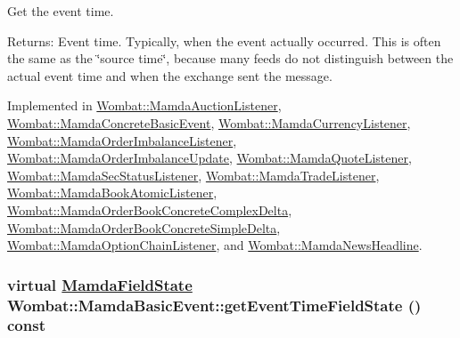Get the event time. 

\begin{Desc}
\item[Returns:]Event time. Typically, when the event actually occurred. This is often the same as the \char`\"{}source time\char`\"{}, because many feeds do not distinguish between the actual event time and when the exchange sent the message. \end{Desc}


Implemented in \hyperlink{classWombat_1_1MamdaAuctionListener_677e3629c44bbf21a134c1fb490658f8}{Wombat::Mamda\-Auction\-Listener}, \hyperlink{classWombat_1_1MamdaConcreteBasicEvent_887c69f7d9259d62ae323ddc3706ac44}{Wombat::Mamda\-Concrete\-Basic\-Event}, \hyperlink{classWombat_1_1MamdaCurrencyListener_f50eaef7c50bd1b1e58f0d38967d2b1c}{Wombat::Mamda\-Currency\-Listener}, \hyperlink{classWombat_1_1MamdaOrderImbalanceListener_6cac146703cca68aecfd579f512d8b99}{Wombat::Mamda\-Order\-Imbalance\-Listener}, \hyperlink{classWombat_1_1MamdaOrderImbalanceUpdate_b2468935aefaa514c68cd2722addc9ba}{Wombat::Mamda\-Order\-Imbalance\-Update}, \hyperlink{classWombat_1_1MamdaQuoteListener_3d5fbd8aa814552de16c665b3eca1dfc}{Wombat::Mamda\-Quote\-Listener}, \hyperlink{classWombat_1_1MamdaSecStatusListener_0e27b7c2e100fbc7247c898c56536d1c}{Wombat::Mamda\-Sec\-Status\-Listener}, \hyperlink{classWombat_1_1MamdaTradeListener_be370d422774375f2724162d7bfe65c2}{Wombat::Mamda\-Trade\-Listener}, \hyperlink{classWombat_1_1MamdaBookAtomicListener_b84977f1c114cc2841c34e0d0efa9055}{Wombat::Mamda\-Book\-Atomic\-Listener}, \hyperlink{classWombat_1_1MamdaOrderBookConcreteComplexDelta_a28362473a741fbcf14382a30f402777}{Wombat::Mamda\-Order\-Book\-Concrete\-Complex\-Delta}, \hyperlink{classWombat_1_1MamdaOrderBookConcreteSimpleDelta_729cedfe13cf6a6036be192c85e518bd}{Wombat::Mamda\-Order\-Book\-Concrete\-Simple\-Delta}, \hyperlink{classWombat_1_1MamdaOptionChainListener_5cf26056ce6135a00627d5efea861dfc}{Wombat::Mamda\-Option\-Chain\-Listener}, and \hyperlink{classWombat_1_1MamdaNewsHeadline_c5172910dd6b87284540452e7267b14e}{Wombat::Mamda\-News\-Headline}.\hypertarget{classWombat_1_1MamdaBasicEvent_ff3932065e16e660fb6cd9285b46f7d0}{
\subsubsection[getEventTimeFieldState]{\setlength{\rightskip}{0pt plus 5cm}virtual \hyperlink{namespaceWombat_93aac974f2ab713554fd12a1fa3b7d2a}{Mamda\-Field\-State} Wombat::Mamda\-Basic\-Event::get\-Event\-Time\-Field\-State () const}}
\label{classWombat_1_1MamdaBasicEvent_ff3932065e16e660fb6cd9285b46f7d0}


